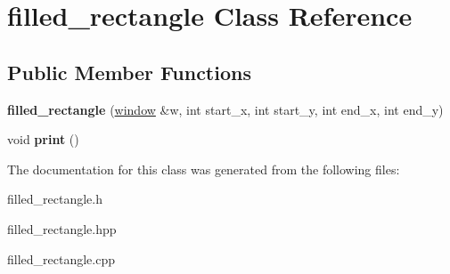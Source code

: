 \hypertarget{classfilled__rectangle}{}\section{filled\+\_\+rectangle Class Reference}
\label{classfilled__rectangle}
\subsection*{Public Member Functions}
\begin{DoxyCompactItemize}
\item 
\mbox{\label{classfilled__rectangle_aa8bbee29edffdb5374c6d99ed1bc8073}} 
{\bfseries filled\+\_\+rectangle} (\hyperlink{classwindow}{window} \&w, int start\+\_\+x, int start\+\_\+y, int end\+\_\+x, int end\+\_\+y)
\item 
\mbox{\label{classfilled__rectangle_aef5f2d6c5d83663512e78a581b400214}} 
void {\bfseries print} ()
\end{DoxyCompactItemize}


The documentation for this class was generated from the following files\+:\begin{DoxyCompactItemize}
\item 
filled\+\_\+rectangle.\+h\item 
filled\+\_\+rectangle.\+hpp\item 
filled\+\_\+rectangle.\+cpp\end{DoxyCompactItemize}
